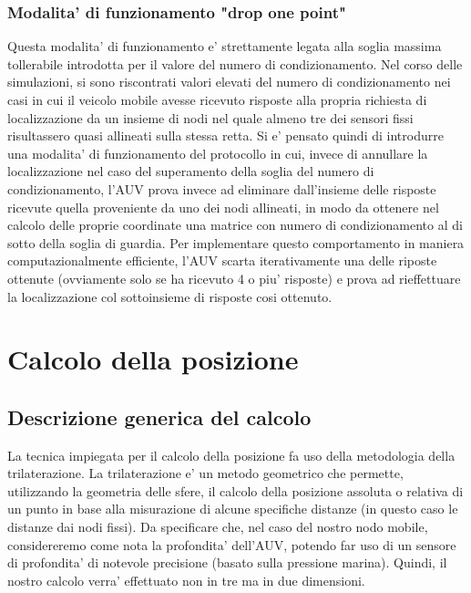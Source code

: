 \subsubsection{Modalita' di funzionamento "drop one point"}
\par
Questa modalita' di funzionamento e' strettamente legata alla soglia massima tollerabile introdotta per il valore del numero di condizionamento. Nel corso delle simulazioni, si sono riscontrati valori elevati del numero di condizionamento nei casi in cui il veicolo mobile avesse ricevuto risposte alla propria richiesta di localizzazione da un insieme di nodi nel quale almeno tre dei sensori fissi risultassero quasi allineati sulla stessa retta. Si e' pensato quindi di introdurre una modalita' di funzionamento del protocollo in cui, invece di annullare la localizzazione nel caso del superamento della soglia del numero di condizionamento, l'AUV prova invece ad eliminare dall'insieme delle risposte ricevute quella proveniente da uno dei nodi allineati, in modo da ottenere nel calcolo delle proprie coordinate una matrice con numero di condizionamento al di sotto della soglia di guardia. Per implementare questo comportamento in maniera computazionalmente efficiente, l'AUV scarta iterativamente una delle riposte ottenute (ovviamente solo se ha ricevuto 4 o piu' risposte) e prova ad rieffettuare la localizzazione col sottoinsieme di risposte cosi ottenuto.
\par


\section{Calcolo della posizione}

\subsection{Descrizione generica del calcolo}
La tecnica impiegata per il calcolo della posizione fa uso della metodologia della trilaterazione. La trilaterazione e' un metodo geometrico che permette, utilizzando la geometria delle sfere, il calcolo della posizione assoluta o relativa di un punto in base alla misurazione di alcune specifiche distanze (in questo caso le distanze dai nodi fissi).\newline
Da specificare che, nel caso del nostro nodo mobile, considereremo come nota la profondita' dell'AUV, potendo far uso di un sensore di profondita' di notevole precisione (basato sulla pressione marina).
Quindi, il nostro calcolo verra' effettuato non in tre ma in due dimensioni. 

